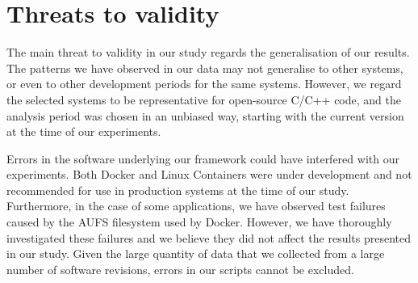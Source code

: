 \section{Threats to validity}
\label{evolution:threats}

The main threat to validity in our study regards the generalisation of our
results.  The patterns we have observed in our data may not generalise to other
systems, or even to other development periods for the same systems.  However,
we regard the selected systems to be representative for open-source C/C++ code,
and the analysis period was chosen in an unbiased way, starting with the
current version at the time of our experiments.

Errors in the software underlying our framework could have interfered with our
experiments. Both Docker and Linux Containers were under development and not
recommended for use in production systems at the time of our study.
Furthermore, in the case of some applications, we have observed test failures
caused by the AUFS filesystem used by Docker. However, we have thoroughly
investigated these failures and we believe they did not affect the results
presented in our study. Given the large quantity of data that we collected from
a large number of software revisions, errors in our scripts cannot be excluded.
